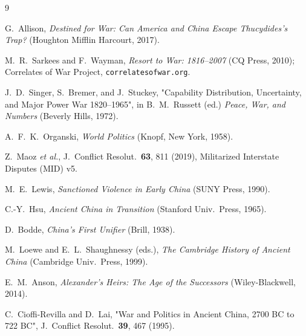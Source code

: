 \documentclass[11pt]{article}
\begin{document}
\begin{thebibliography}{9}\small

 G.~Allison, \emph{Destined for War: Can America and
China Escape Thucydides's Trap?} (Houghton Mifflin Harcourt, 2017).

 M.~R.~Sarkees and F.~Wayman, \emph{Resort to War:
1816--2007} (CQ Press, 2010);
Correlates of War Project, \texttt{correlatesofwar.org}.

 J.~D.~Singer, S.~Bremer, and J.~Stuckey,
"Capability Distribution, Uncertainty, and Major Power War 1820--1965",
in B.~M.~Russett (ed.) \emph{Peace, War, and Numbers} (Beverly Hills, 1972).

 A.~F.~K.~Organski, \emph{World Politics}
(Knopf, New York, 1958).

 Z.~Maoz \emph{et al.}, J.~Conflict Resolut.~\textbf{63},
811 (2019), Militarized Interstate Disputes (MID) v5.

 M.~E.~Lewis, \emph{Sanctioned Violence in Early China}
(SUNY Press, 1990).

 C.-Y.~Hsu, \emph{Ancient China in Transition}
(Stanford Univ.\ Press, 1965).

 D.~Bodde, \emph{China's First Unifier}
(Brill, 1938).

 M.~Loewe and E.~L.~Shaughnessy (eds.),
\emph{The Cambridge History of Ancient China} (Cambridge Univ.\ Press, 1999).

 E.~M.~Anson, \emph{Alexander's Heirs: The Age of
the Successors} (Wiley-Blackwell, 2014).

 C.~Cioffi-Revilla and D.~Lai,
"War and Politics in Ancient China, 2700 BC to 722 BC",
J.~Conflict Resolut.\ \textbf{39}, 467 (1995).

\end{thebibliography}
\end{document}
